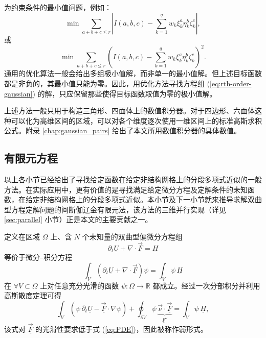 为约束条件的最小值问题，例如：
\begin{equation}
\min\sum_{a+b+c\le r}\left|I(a,b,c)-\sum_{k=1}^{q}w_{k}\xi_{k}^{a}\eta_{k}^{b}\zeta_{k}^{c}\right|,
\end{equation}
 或
\begin{equation}
\min\sum_{a+b+c\le r}\left(I(a,b,c)-\sum_{k=1}^{q}w_{k}\xi_{k}^{a}\eta_{k}^{b}\zeta_{k}^{c}\right)^{2}.
\end{equation}
通用的优化算法一般会给出多组极小值解，而非单一的最小值解。但上述目标函数都是非负的，其最小值只能为零。因此，用优化方法寻找方程组 (\ref{eq:rth-order-gaussian})
的解，只应保留那些使得目标函数取值为零的极小值解。

上述方法一般只用于构造三角形、四面体上的数值积分器。对于四边形、六面体这种可以化为高维区间的区域，可以对各个维度逐次使用一维区间上的标准高斯求积公式。附录
\ref{chap:gaussian_pairs} 给出了本文所用数值积分器的具体数值。

\subsection{有限元方程}

以上各小节已经给出了寻找给定函数在给定非结构网格上的分段多项式近似的一般方法。在实际应用中，更有价值的是寻找满足给定微分方程及定解条件的未知函数，在给定非结构网格上的分段多项式近似。本小节及下一小节就来推导求解双曲型方程定解问题的间断伽辽金有限元法，该方法的三维并行实现（详见
\ref{sec:parallel} 小节）正是本文的主要贡献之一。

定义在区域 $\varOmega$ 上、含 $N$ 个未知量的双曲型偏微分方程组
\begin{equation}
\partial_{t}\underline{U}+\nabla\cdot\underline{\vec{F}}=\underline{H}\label{eq:PDE}
\end{equation}
等价于微分–积分方程
\begin{equation}
\int_{V}\left(\partial_{t}\underline{U}+\nabla\cdot\underline{\vec{F}}\right)\psi=\int_{V}\psi\,\underline{H}
\end{equation}
在 $\forall V\subset\varOmega$ 上对任意充分光滑的函数 $\psi\colon\varOmega\to\mathbb{R}$
都成立。经过一次分部积分并利用高斯散度定理可得
\begin{equation}
\int_{V}\left(\psi\,\partial_{t}\underline{U}-\underline{\vec{F}}\cdot\nabla\psi\right)+\oint_{\partial V}\psi\,\underbrace{\vec{\nu}\cdot\underline{\vec{F}}}_{\underline{F}^{\nu}}=\int_{V}\psi\,\underline{H},\label{eq:weak-form}
\end{equation}
该式对 $\underline{\vec{F}}$ 的光滑性要求低于式 (\ref{eq:PDE})，因此被称作弱形式。

